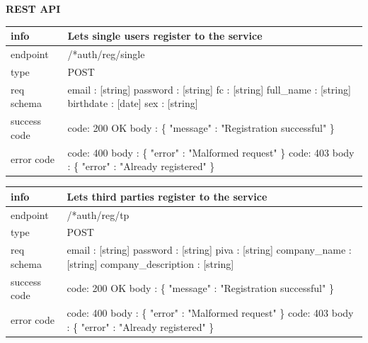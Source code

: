 \documentclass[titlepage]{article}
\begin{document}
{\bf REST API}

\begin{tabularx}{\textwidth}{lX} \hline
    info & Lets single users register to the service \\ \hline
    endpoint & /*auth/reg/single \\ \hline
    type & POST \\ \hline
    req schema & 
        email : [string] \newline
        password : [string] \newline
        fc : [string] \newline
        full\_name : [string] \newline
        birthdate : [date] \newline
        sex : [string] \\ \hline
    success code &
        code: 200 OK \newline 
        body : \{ \newline
        "message" : "Registration successful" \newline
        \} \\ \hline
    error code &
        code: 400 \newline
        body : \{ "error" : "Malformed request" \} \newline \newline
        code: 403 \newline
        body : \{ "error" : "Already registered" \}
\end{tabularx}

\vspace{\baselineskip}

\begin{tabularx}{\textwidth}{lX} \hline
    info & Lets third parties register to the service \\ \hline
    endpoint & /*auth/reg/tp \\ \hline
    type & POST \\ \hline
    req schema & 
        email : [string] \newline
        password : [string] \newline
        piva : [string] \newline
        company\_name : [string] \newline
        company\_description : [string] \\ \hline
    success code &
        code: 200 OK \newline \newline 
        body : \{ \newline
        "message" : "Registration successful" \newline
        \} \\ \hline
    error code &
        code: 400 \newline
        body : \{ "error" : "Malformed request" \} \newline \newline
        code: 403 \newline
        body : \{ "error" : "Already registered" \}
\end{tabularx}
		
\end{document}
